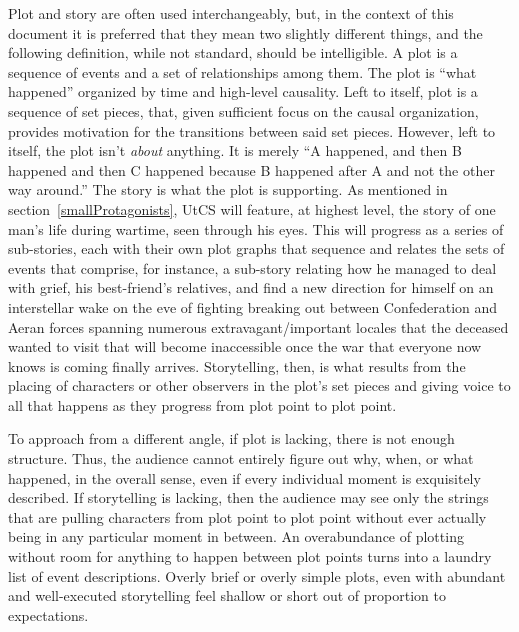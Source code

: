 Plot and story are often used interchangeably, but, in the context of
this document it is preferred that they mean two slightly different
things, and the following definition, while not standard, should be
intelligible. A plot is a sequence of events and a set of
relationships among them. The plot is ``what happened'' organized by
time and high-level causality. Left to itself, plot is a sequence of
set pieces, that, given sufficient focus on the causal organization,
provides motivation for the transitions between said set
pieces. However, left to itself, the plot isn't {\em about}
anything. It is merely ``A happened, and then B happened and then C
happened because B happened after A and not the other way around.''
The story is what the plot is supporting. As mentioned in
section~\ref{smallProtagonists}, UtCS will feature, at highest level,
the story of one man's life during wartime, seen through his
eyes. This will progress as a series of sub-stories, each with their
own plot graphs that sequence and relates the sets of events that
comprise, for instance, a sub-story relating how he managed to deal
with grief, his best-friend's relatives, and find a new direction for
himself on an interstellar wake on the eve of fighting breaking out
between Confederation and Aeran forces spanning numerous
extravagant/important locales that the deceased wanted to visit that
will become inaccessible once the war that everyone now knows is
coming finally arrives. Storytelling, then, is what results from the
placing of characters or other observers in the plot's set pieces and
giving voice to all that happens as they progress from plot point to
plot point.

To approach from a different angle, if plot is lacking, there is not
enough structure. Thus, the audience cannot entirely figure out why,
when, or what happened, in the overall sense, even if every individual
moment is exquisitely described. If storytelling is lacking, then the
audience may see only the strings that are pulling characters from
plot point to plot point without ever actually being in any particular
moment in between. An overabundance of plotting without room for
anything to happen between plot points turns into a laundry list of
event descriptions. Overly brief or overly simple plots, even with
abundant and well-executed storytelling feel shallow or short out of
proportion to expectations.

